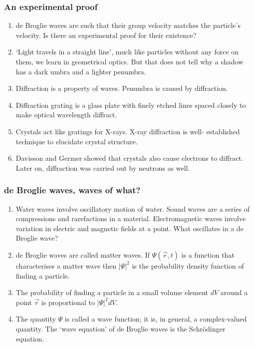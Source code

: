 \documentclass{beamer}
\begin{document}
\begin{frame}
\frametitle{An experimental proof}
\begin{enumerate}
\item de Broglie waves are such that their group velocity matches the particle's
velocity. Is there an experimental proof for their existence?
\item `Light travels in a straight line', much like particles without any force 
on them, we learn in geometrical optics. But that does not tell why a shadow 
has a dark umbra and a lighter penumbra.
\item Diffraction is a property of waves. Penumbra is caused by diffraction.
\item Diffraction grating is a glass plate with finely etched lines spaced 
closely to make optical wavelength diffract.
\item Crystals act like gratings for X-rays. X-ray diffraction is well-
established technique to elucidate crystal structure.
\item Davisson and Germer showed that crystals also cause electrons to diffract.
Later on, diffraction was carried out by neutrons as well.
\end{enumerate}
\end{frame}

\begin{frame}
\frametitle{de Broglie waves, waves of what?}
\begin{enumerate}
\item Water waves involve oscillatory motion of water. Sound waves are a series
of compressions and rarefactions in a material. Electromagnetic waves involve
variation in electric and magnetic fields at a point. What oscillates in a de
Broglie wave?
\item de Broglie waves are called matter waves. If $\Psi(\vec{r}, t)$ is a 
function that characterises a matter wave then $|\Psi|^2$ is the probability
density function of finding a particle.
\item The probability of finding a particle in a small volume element $dV$
around a point $\vec{r}$ is proportional to $|\Psi|^2 dV$.
\item The quantity $\Psi$ is called a wave function; it is, in general, a 
complex-valued quantity. The `wave equation' of de Broglie waves is the 
Schr\"{o}dinger equation. 
\end{enumerate}
\end{frame}
\end{document}
